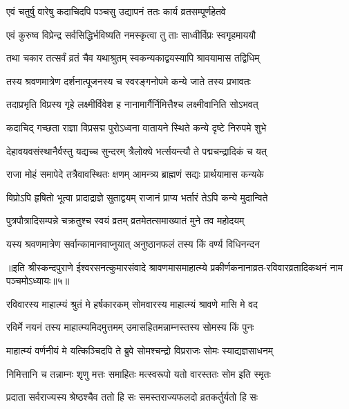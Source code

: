 \twolineshloka
{एवं चतुर्षु वारेषु कदाचिदपि पञ्चसु}
{उद्यापनं ततः कार्य व्रतसम्पूर्णहेतवे} %

\twolineshloka
{एवं कुरुष्व विप्रेन्द्र सर्वसिद्धिर्भविष्यति}
{नमस्कृत्वा तु ताः साध्वीर्विप्रः स्वगृहमाययौ} %

\twolineshloka
{तथा चकार तत्सर्वं व्रतं चैव यथाश्रुतम्}
{स्वकन्यकाद्वयस्यापि श्रावयामास तद्विधिम्} %

\twolineshloka
{तस्य श्रवणमात्रेण दर्शनात्पूजनस्य च}
{स्वरङ्गनोपमे कन्ये जाते तस्य प्रभावतः} %

\twolineshloka
{तदाप्रभृति विप्रस्य गृहे लक्ष्मीर्विवेश ह}
{नानामार्गैर्निमित्तैश्च लक्ष्मीवानिति सोऽभवत्} %

\twolineshloka
{कदाचिद् गच्छता राज्ञा विप्रसद्म पुरोऽध्वना}
{वातायने स्थिते कन्ये दृष्टे निरुपमे शुभे} %

\twolineshloka
{देहावयवसंस्थानैर्वस्तु यद्यच्च सुन्दरम्}
{त्रैलोक्ये भर्त्सयन्त्यौ ते पद्मचन्द्रादिकं च यत्} %

\twolineshloka
{राजा मोहं समापेदे तत्रैवावस्थितः क्षणम्}
{आमन्त्र्य ब्राह्मणं सद्यः प्रार्थयामास कन्यके} %

\twolineshloka
{विप्रोऽपि हृषितो भूत्वा प्रादाद्राज्ञे सुताद्वयम्}
{राजानं प्राप्य भर्तारं तेऽपि कन्ये मुदान्विते} %

\twolineshloka
{पुत्रपौत्रादिसम्पन्ने चक्रतुश्च स्वयं व्रतम्}
{व्रतमेतत्समाख्यातं मुने तव महोदयम्} %

\twolineshloka
{यस्य श्रवणमात्रेण सर्वान्कामानवाप्नुयात्}
{अनुष्ठानफलं तस्य किं वर्ण्य विधिनन्दन} %


{॥इति श्रीस्कन्दपुराणे ईश्वरसनत्कुमारसंवादे श्रावणमासमाहात्म्ये प्रकीर्णकनानाव्रत-रविवारव्रतादिकथनं नाम पञ्चमोऽध्यायः॥५॥}




\twolineshloka
{रविवारस्य माहात्म्यं श्रुतं मे हर्षकारकम्}
{सोमवारस्य माहात्म्यं श्रावणे मासि मे वद} %


\twolineshloka
{रविर्मे नयनं तस्य माहात्म्यमिदमुत्तमम्}
{उमासहितमन्नाम्नस्तस्य सोमस्य किं पुनः} %

\twolineshloka
{माहात्म्यं वर्णनीयं मे यत्किञ्चिदपि ते ब्रुवे}
{सोमश्चन्द्रो विप्रराजः सोमः स्याद्यज्ञसाधनम्} %

\twolineshloka
{निमित्तानि च तन्नाम्नः शृणु मत्तः समाहितः}
{मत्स्वरूपो यतो वारस्ततः सोम इति स्मृतः} %

\twolineshloka
{प्रदाता सर्वराज्यस्य श्रेष्ठश्चैव ततो हि सः}
{समस्तराज्यफलदो व्रतकर्तुर्यतो हि सः} %

